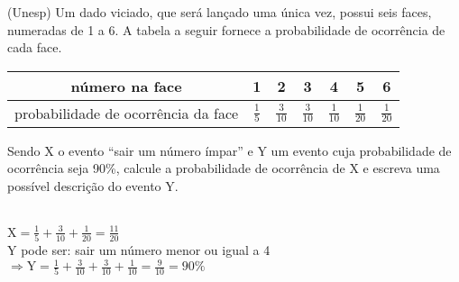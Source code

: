 \begin{ex}
  (Unesp) Um dado viciado, que será lançado uma única vez, possui seis faces, numeradas de 1 a 6. A tabela a seguir fornece a probabilidade de ocorrência de cada face.
   \begin{center}
       \begin{tabular}{|c|c|c|c|c|c|c|}  \hline
           número na face & 1 & 2 & 3 & 4 & 5 & 6 \\
 \hline            
probabilidade de ocorrência da face & $\frac{1}{5}$ & $\frac{3}{10}$ & $\frac{3}{10}$ & $\frac{1}{10}$ & $\frac{1}{20}$ & $\frac{1}{20}$ \\ \hline
       \end{tabular}
   \end{center}
  Sendo X o evento “sair um número ímpar” e Y um evento cuja probabilidade de ocorrência seja 90\%, calcule a probabilidade de ocorrência de X e escreva uma possível descrição do evento Y. 
    \begin{sol}
     \phantom{A} \\
     $\text{X}= \frac{1}{5}+\frac{3}{10}+\frac{1}{20}=\frac{11}{20}$ \\
     Y pode ser: sair um número menor ou igual a 4 \hspace{0,3cm} $\Rightarrow \text{Y}=\frac{1}{5}+\frac{3}{10}+\frac{3}{10}+\frac{1}{10}=\frac{9}{10}=90\%$
    \end{sol}
 \end{ex}